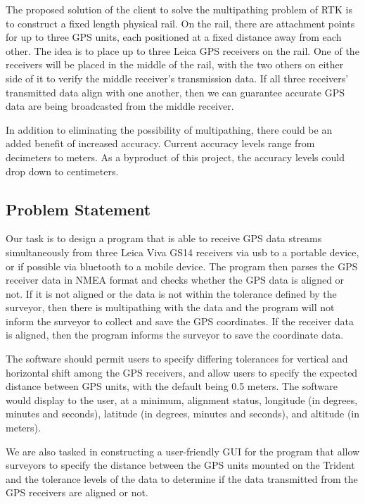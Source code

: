 \documentclass[12pt]{article}
\begin{document}
The proposed solution of the client to solve the multipathing problem of RTK is to construct a fixed length physical rail. On the rail, there are attachment points for up to three GPS units, each positioned at a fixed distance away from each other. The idea is to place up to three Leica GPS receivers on the rail. One of the receivers will be placed in the middle of the rail, with the two others on either side of it to verify the middle receiver’s transmission data. If all three receivers’ transmitted data align with one another, then we can guarantee accurate GPS data are being broadcasted from the middle receiver.

In addition to eliminating the possibility of multipathing, there could be an added benefit of increased accuracy. Current accuracy levels range from decimeters to meters. As a byproduct of this project, the accuracy levels could drop down to centimeters.
\subsection{Problem Statement}

Our task is to design a program that is able to receive GPS data streams simultaneously from three Leica Viva GS14 receivers via usb to a portable device, or if possible via bluetooth to a mobile device. The program then parses the GPS receiver data in NMEA format and checks whether the GPS data is aligned or not. If it is not aligned or the data is not within the tolerance defined by the surveyor, then there is multipathing with the data and the program will not inform the surveyor to collect and save the GPS coordinates. If the receiver data is aligned, then the program informs the surveyor to save the coordinate data.  
 
The software should permit users to specify differing tolerances for vertical and horizontal shift among the GPS receivers, and allow users to specify the expected distance between GPS units, with the default being 0.5 meters. The software would display to the user, at a minimum, alignment status, longitude (in degrees, minutes and seconds), latitude (in degrees, minutes and seconds), and altitude (in meters).   
 
We are also tasked in constructing a user-friendly GUI for the program that allow surveyors to specify the distance between the GPS units mounted on the Trident and the tolerance levels of the data to determine if the data transmitted from the GPS receivers are aligned or not. 
 
\end{document}
